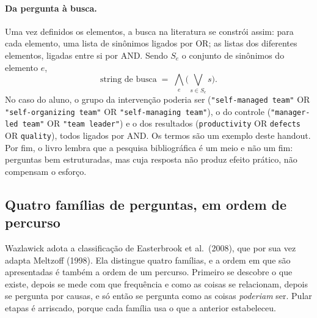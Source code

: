 \documentclass[10pt,a4paper]{extarticle}
\theoremstyle{definition}
\begin{document}
\paragraph{Da pergunta à busca.} Uma vez definidos os elementos, a busca na literatura se constrói assim: para cada elemento, uma lista de sinônimos ligados por OR; as listas dos diferentes elementos, ligadas entre si por AND. Sendo $S_e$ o conjunto de sinônimos do elemento $e$,
\[
\text{string de busca}\;=\;\bigwedge_{e}\Big(\bigvee_{s\in S_e}s\Big).
\]
No caso do aluno, o grupo da intervenção poderia ser (\texttt{"self-managed team"} OR \texttt{"self-organizing team"} OR \texttt{"self-managing team"}), o do controle (\texttt{"manager-led team"} OR \texttt{"team leader"}) e o dos resultados (\texttt{productivity} OR \texttt{defects} OR \texttt{quality}), todos ligados por AND. Os termos são um exemplo deste handout. Por fim, o livro lembra que a pesquisa bibliográfica é um meio e não um fim: perguntas bem estruturadas, mas cuja resposta não produz efeito prático, não compensam o esforço.

\subsection{Quatro famílias de perguntas, em ordem de percurso}

Wazlawick adota a classificação de Easterbrook et al.\ (2008), que por sua vez adapta Meltzoff (1998). Ela distingue quatro famílias, e a ordem em que são apresentadas é também a ordem de um percurso. Primeiro se descobre o que existe, depois se mede com que frequência e como as coisas se relacionam, depois se pergunta por causas, e só então se pergunta como as coisas \emph{poderiam} ser. Pular etapas é arriscado, porque cada família usa o que a anterior estabeleceu.
\end{document}
